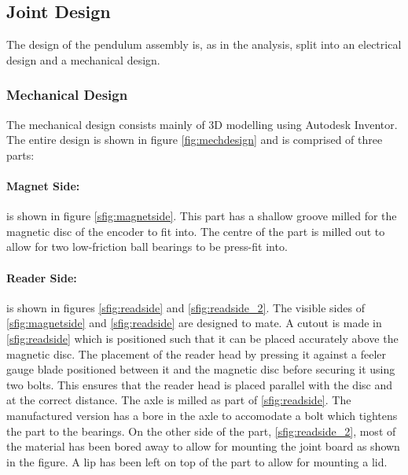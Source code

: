 \subsection{Joint Design} %
\label{sub:joint_design}
The design of the pendulum assembly is, as in the analysis, split into an electrical design and a mechanical design.


\subsubsection{Mechanical Design} %
\label{ssub:mechanical_design}
The mechanical design consists mainly of 3D modelling using Autodesk Inventor.
The entire design is shown in figure \ref{fig:mechdesign} and is comprised of three parts:
\paragraph{Magnet Side:} %
\label{par:magnet_side}
is shown in figure \ref{sfig:magnetside}. 
This part has a shallow groove milled for the magnetic disc of the encoder to fit into.
The centre of the part is milled out to allow for two low-friction ball bearings to be press-fit into.
\paragraph{Reader Side:} %
\label{par:reader_side}
is shown in figures \ref{sfig:readside} and \ref{sfig:readside_2}.
The visible sides of \ref{sfig:magnetside} and \ref{sfig:readside} are designed to mate.
A cutout is made in \ref{sfig:readside} which is positioned such that it can be placed accurately above the magnetic disc.
The placement of the reader head by pressing it against a feeler gauge blade positioned between it and the magnetic disc before securing it using two bolts.
This ensures that the reader head is placed parallel with the disc and at the correct distance.
The axle is milled as part of \ref{sfig:readside}.
The manufactured version has a bore in the axle to accomodate a bolt which tightens the part to the bearings.
On the other side of the part, \ref{sfig:readside_2}, most of the material has been bored away to allow for mounting the joint board as shown in the figure.
A lip has been left on top of the part to allow for mounting a lid.

